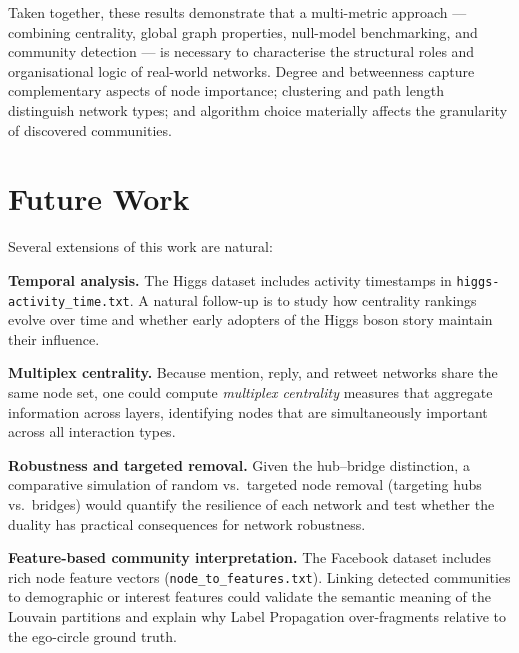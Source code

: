 Taken together, these results demonstrate that a multi-metric approach
— combining centrality, global graph properties, null-model benchmarking,
and community detection — is necessary to characterise the structural
roles and organisational logic of real-world networks.
Degree and betweenness capture complementary aspects of node importance;
clustering and path length distinguish network types; and algorithm choice
materially affects the granularity of discovered communities.

\section{Future Work}
\label{sec:future}

Several extensions of this work are natural:

\textbf{Temporal analysis.}
The Higgs dataset includes activity timestamps in
\texttt{higgs-activity\_time.txt}.
A natural follow-up is to study how centrality rankings evolve over time and
whether early adopters of the Higgs boson story maintain their influence.

\textbf{Multiplex centrality.}
Because mention, reply, and retweet networks share the same node set, one
could compute \textit{multiplex centrality} measures that aggregate
information across layers, identifying nodes that are simultaneously
important across all interaction types.

\textbf{Robustness and targeted removal.}
Given the hub--bridge distinction, a comparative simulation of random vs.\
targeted node removal (targeting hubs vs.\ bridges) would quantify the
resilience of each network and test whether the duality has practical
consequences for network robustness.

\textbf{Feature-based community interpretation.}
The Facebook dataset includes rich node feature vectors (\texttt{node\_to\_features.txt}).
Linking detected communities to demographic or interest features could
validate the semantic meaning of the Louvain partitions and explain why
Label Propagation over-fragments relative to the ego-circle ground truth.
